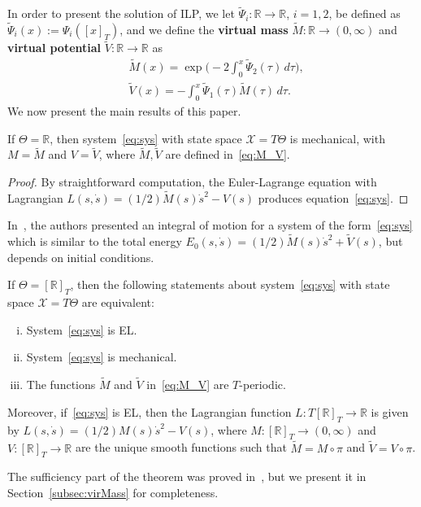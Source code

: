 In order to present the solution of ILP, we let $\tilde \Psi_i: \mathbb{R}
\to \mathbb{R}$, $i=1,2$, be defined as $\tilde \Psi_i(x) :=\Psi_i([x]_T)$,
and we define the {\bf virtual mass} $\tilde M :\mathbb{R} \to (0,\infty)$
and {\bf virtual potential} $\tilde V : \mathbb{R} \to \mathbb{R}$ as
\begin{equation}
\label{eq:M_V}
\begin{aligned}
& \tilde{M}(x) =
\exp\Big(-2\int_0^{x}\tilde{\Psi}_2(\tau)\,d\tau\Big), \\
& \tilde{V}(x)= -\int_0^{x}\tilde{\Psi}_1(\tau)\tilde{M}(\tau)\,d\tau.
\end{aligned}
\end{equation}
We now present the main results of this paper.
\begin{theorem}\label{thm:ILPsolution:part1}
	If $\Theta = \mathbb{R}$, then system~\eqref{eq:sys} with state space $\mathcal{X} =
	T \Theta$ is mechanical, with $M = \tilde M$ and $V=\tilde V$, where
	$\tilde M,\tilde V$ are defined in~\eqref{eq:M_V}.
\end{theorem}
\begin{proof}
	By straightforward computation, the Euler-Lagrange equation with
	Lagrangian $L(s,\dot s) = (1/2) \tilde M(s) \dot s^2- V(s)$ produces
	equation~\eqref{eq:sys}.  \qquad\end{proof}
\begin{remark}
	In~\cite{ShiPerWit05,ShiRobPerSan06}, the authors presented an
	integral of motion for a system of the form~\eqref{eq:sys} which is
	similar to the total energy $E_0(s,\dot s) = (1/2) \tilde M(s) \dot
	s^2 + \tilde V(s)$, but depends on initial conditions.
\end{remark}
\begin{theorem}\label{thm:ILPsolution:part2}
	If $\Theta = [\mathbb{R}]_T$, then the following statements about
	system~\eqref{eq:sys} with state space $\mathcal{X} = T \Theta$ are
	equivalent:
	
	\begin{enumerate}[(i)]
		
		\item System~\eqref{eq:sys} is EL.
		
		\item System~\eqref{eq:sys} is mechanical.
		
		\item The functions $\tilde M$ and $\tilde V$ in~\eqref{eq:M_V} are
		$T$-periodic. 
	\end{enumerate}
	
	Moreover, if~\eqref{eq:sys} is EL, then the Lagrangian function $L : T
	[\mathbb{R}]_T \to \mathbb{R}$ is given by $L(s,\dot s) = (1/2) M(s) \dot s^2 -
	V(s)$, where $M:[\mathbb{R}]_T \to (0,\infty)$ and $V: [\mathbb{R}]_T \to \mathbb{R}$ are
	the unique smooth functions such that $\tilde M = M \circ \pi$ and
	$\tilde V = V \circ \pi$.
\end{theorem}
\begin{remark}
	The sufficiency part of the theorem was proved
	in~\cite{Maggiore-2012,Dame-2012a}, but we present it in
	Section~\ref{subsec:virMass} for completeness.
\end{remark}

